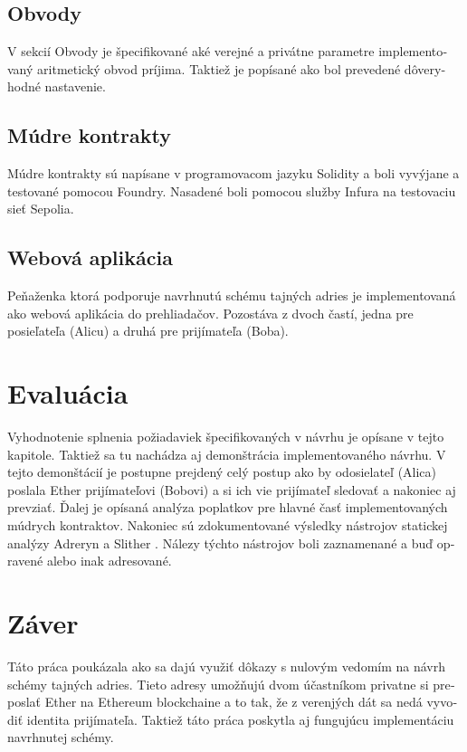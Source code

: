 \begin{otherlanguage}{slovak}
\subsection{Obvody}

V sekcií Obvody je špecifikované aké verejné a privátne parametre implementovaný
aritmetický obvod príjima. Taktiež je popísané ako bol prevedené dôveryhodné
nastavenie.

\subsection{Múdre kontrakty}

Múdre kontrakty sú napísane v programovacom jazyku Solidity a boli vyvýjane a
testované pomocou Foundry. Nasadené boli pomocou služby Infura na testovaciu
sieť Sepolia.

\subsection{Webová aplikácia}

Peňaženka ktorá podporuje navrhnutú schému tajných adries je implementovaná ako
webová aplikácia do prehliadačov. Pozostáva z dvoch častí, jedna pre posieľateľa
(Alicu) a druhá pre prijímateľa (Boba).

\section{Evaluácia}

Vyhodnotenie splnenia požiadaviek špecifikovaných v návrhu je opísane v tejto
kapitole. Taktiež sa tu nachádza aj demonštrácia implementovaného návrhu. V tejto
demonštácií je postupne prejdený celý postup ako by odosielateľ (Alica) poslala
Ether prijímateľovi (Bobovi) a si ich vie prijímateľ sledovať a nakoniec
aj prevziať. Ďalej je opísaná analýza poplatkov pre hlavné časť implementovaných
múdrych kontraktov. Nakoniec sú zdokumentované výsledky nástrojov statickej analýzy
Adreryn \cite{githubCyfrinaderyn} a Slither \cite{githubCryticslither}. Nálezy
týchto nástrojov boli zaznamenané a buď opravené alebo inak adresované.

\section{Záver}

Táto práca poukázala ako sa dajú využiť dôkazy s nulovým vedomím na návrh
schémy tajných adries. Tieto adresy umožňujú dvom účastníkom privatne si preposlať
Ether na Ethereum blockchaine a to tak, že z verenjých dát sa nedá vyvodiť
identita prijímateľa. Taktiež táto práca poskytla aj fungujúcu implementáciu
navrhnutej schémy. 


\end{otherlanguage}
